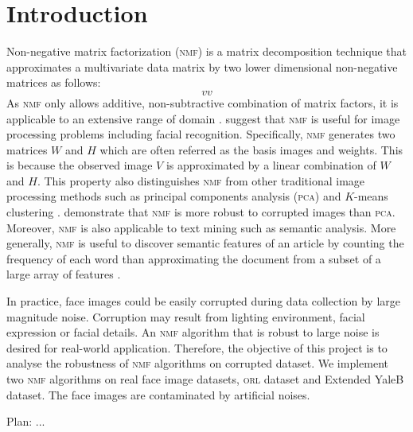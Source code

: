 \section{Introduction\label{chapter1}}
Non-negative matrix factorization (\textsc{nmf}) is a matrix decomposition technique that approximates a multivariate data matrix by two lower dimensional non-negative matrices as follows:
\begin{equation*}
  vv
\end{equation*}
As \textsc{nmf} only allows additive, non-subtractive combination of matrix factors, it is applicable to an extensive range of domain . \citet{lee1999learning} suggest that \textsc{nmf} is useful for image processing problems including facial recognition. Specifically, \textsc{nmf} generates two matrices $W$ and $H$ which are often referred as the basis images and weights. This is because the observed image $V$ is approximated by a linear combination of $W$ and $H$. This property also distinguishes \textsc{nmf} from other traditional image processing methods such as principal components analysis (\textsc{pca}) and $K$-means clustering . \citet{guillamet2002non} demonstrate that \textsc{nmf} is more robust to corrupted images than \textsc{pca}.
Moreover, \textsc{nmf} is also applicable to text mining such as semantic analysis. More generally, \textsc{nmf} is useful to discover semantic features of an article by counting the frequency of each word than approximating the document from a subset of a large array of features \citep{lee1999learning}.


In practice, face images could be easily corrupted during data collection by large magnitude noise. Corruption may result from lighting environment, facial expression or facial details. An \textsc{nmf} algorithm that is robust to large noise is desired for real-world application. Therefore, the objective of this project is to analyse the robustness of \textsc{nmf} algorithms on corrupted dataset. We implement two \textsc{nmf} algorithms on real face image datasets, \textsc{orl} dataset and Extended YaleB dataset. The face images are contaminated by artificial noises.

Plan:
...



